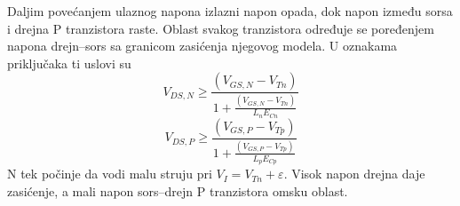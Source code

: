 Daljim povećanjem ulaznog napona izlazni napon opada, dok napon između sorsa i drejna P tranzistora raste. Oblast svakog tranzistora određuje se poređenjem napona drejn–sors sa granicom zasićenja njegovog modela. U oznakama priključaka ti uslovi su
\[V_{DS,N}\ge\frac{(V_{GS,N}-V_{Tn})}{1+\frac{(V_{GS,N}-V_{Tn})}{L_nE_{Cn}}}\]
\[V_{DS,P}\ge\frac{(V_{GS,P}-V_{Tp})}{1+\frac{(V_{GS,P}-V_{Tp})}{L_pE_{Cp}}}\]
N tek počinje da vodi malu struju pri $V_I=V_{Tn}+\varepsilon$. Visok napon drejna daje zasićenje, a mali napon sors–drejn P tranzistora omsku oblast.
